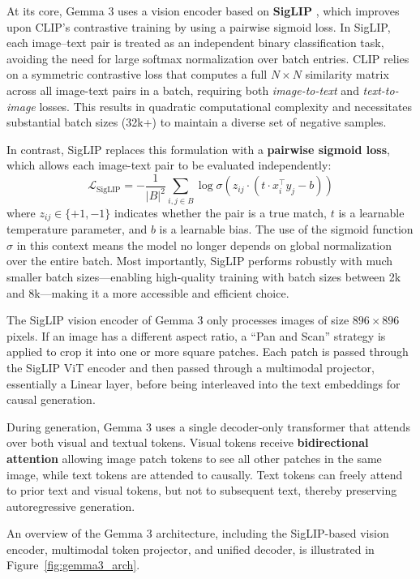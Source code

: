 At its core, Gemma 3 uses a vision encoder based on \textbf{SigLIP} \cite{tsimpoukelli2023siglip}, which improves upon CLIP’s contrastive training by using a pairwise sigmoid loss. In SigLIP, each image–text pair is treated as an independent binary classification task, avoiding the need for large softmax normalization over batch entries.
CLIP relies on a symmetric contrastive loss that computes a full $N \times N$ similarity matrix across all image-text pairs in a batch, requiring both \textit{image-to-text} and \textit{text-to-image} losses. This results in quadratic computational complexity and necessitates substantial batch sizes (32k+) to maintain a diverse set of negative samples.

In contrast, SigLIP replaces this formulation with a \textbf{pairwise sigmoid loss}, which allows each image-text pair to be evaluated independently:
$$
\mathcal{L}_{\text{SigLIP}} = -\frac{1}{|B|^2} \sum_{i,j \in B} \log \sigma(z_{ij} \cdot (t \cdot x_i^\top y_j - b))
$$
where $z_{ij} \in \{+1, -1\}$ indicates whether the pair is a true match, $t$ is a learnable temperature parameter, and $b$ is a learnable bias. The use of the sigmoid function $\sigma$ in this context means the model no longer depends on global normalization over the entire batch.
Most importantly, SigLIP performs robustly with much smaller batch sizes—enabling high-quality training with batch sizes between 2k and 8k—making it a more accessible and efficient choice.

The SigLIP vision encoder of Gemma 3 only processes images of size $896\times 896$ pixels. 
If an image has a different aspect ratio, a ``Pan and Scan'' strategy is applied to crop it into one or more square patches. 
Each patch is passed through the SigLIP ViT encoder and then passed through a multimodal projector, essentially a Linear layer, before being interleaved into the text embeddings for causal generation.

During generation, Gemma 3 uses a single decoder-only transformer that attends over both visual and textual tokens. 
Visual tokens receive \textbf{bidirectional attention} allowing image patch tokens to see all other patches in the same image, while text tokens are attended to causally. 
Text tokens can freely attend to prior text and visual tokens, but not to subsequent text, thereby preserving autoregressive generation.

An overview of the Gemma 3 architecture, including the SigLIP-based vision encoder, multimodal token projector, and unified decoder, is illustrated in Figure~\ref{fig:gemma3_arch}.

